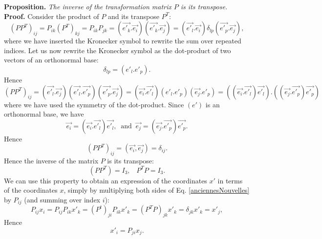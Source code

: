 \documentclass[DIV=12]{article}
\begin{document}
{\bf{Proposition.}} {\emph{The inverse of the transformation matrix $P$ is its  transpose.}}\\

{\bf{Proof.}} Consider the product of $P$ and its transpose $P^T$:\\
\begin{equation}
(PP^T)_{ij} =  P_{ik}(P^T)_{kj} =P_{ik}P_{jk} = (\vec{e'_k}.\vec{e_i})(\vec{e'_k}.\vec{e_j}) = (\vec{e'_l}.\vec{e_i})\delta_{lp}(\vec{e'_p}.\vec{e_j}),
\end{equation}
where we have inserted the Kronecker symbol to rewrite the sum over repeated indices. Let us now rewrite 
 the Kronecker symbol as the dot-product of two vectors of an orthonormal base:
\begin{equation}
\delta_{lp}= (e'_l.e'_p).
\end{equation}
Hence
\begin{equation}
(PP^T)_{ij} = (\vec{e'_l}.\vec{e_j})(\vec{e'_l}.\vec{e'_p})(\vec{e'_p}.\vec{e_j}) = (\vec{e_i}.\vec{e'_l})(e'_l.e'_p)(\vec{e_j}.e'_p)=
 \left((\vec{e_i}.\vec{e'_l})\vec{e'_l}\right). \left((\vec{e_j}.\vec{e'_p}) \vec{e'_p}\right)
\end{equation}
where we have used the symmetry of the dot-product. Since $(e')$ is an orthonormal base, we have
\begin{equation}
 \vec{e_i} = (\vec{e_i}.\vec{e'_l})\vec{e'_l},\;\;{\mathrm{and}}\;\; \vec{e_j} = (\vec{e_j}.\vec{e'_p}) \vec{e'_p}.
\end{equation}
Hence\\
\begin{equation}
\boxed{
(PP^T)_{ij} =(\vec{e_i},\vec{e_j}) =  \delta_{ij}.
}
\label{PPtrans}
\end{equation}
\vspace{3mm}
Hence the inverse of the matrix $P$ is its transpose:
\begin{equation}
(PP^T) = I_3,\;\;\; P^TP = I_3.
\label{PPtrans}
\end{equation}
 We can use this property to obtain an expression of the coordinates $x'$ in terms of the 
coordinates $x$, simply by multiplying both sides of Eq. \ref{anciennesNouvelles} by 
 $P_{ij}$ (and summing over index $i$):
\begin{equation}
 P_{ij}x_i = P_{ij}P_{ik}x'_k = (P^t)_{ji} P_{ik} x'_k = (P^T P)_{jk} x'_k = \delta_{jk} x'_k = x'_j,
\label{anciennesNouvellesPre}
\end{equation}
Hence
\begin{equation}
\boxed{x'_i =  P_{ji}x_j.}
\label{nouvellesAnciennes}
\end{equation}
\end{document}
